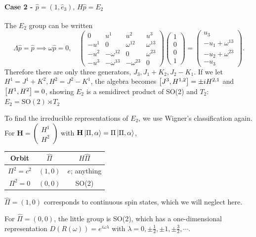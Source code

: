 \documentclass{article}
\begin{document}
\paragraph{Case 2 - $\hat p=(1,\hat e_3),\,H\hat p=E_2$} The $E_2$ group can be written 
$$\Lambda\hat p=\hat p\implies\omega\hat p=0,\quad\begin{pmatrix}0&u^1&u^2&u^3\\-u^1&0&\omega^{12}&\omega^{13}\\-u^2&-\omega^{12}&0&\omega^{23}\\-u^3&-\omega^{13}&-\omega^{23}&0\end{pmatrix}\begin{pmatrix}1\\0\\0\\1\end{pmatrix}=\begin{pmatrix}u_3\\-u_1+\omega^{13}\\-u_2+\omega^{23}\\-u_3\end{pmatrix}.$$
Therefore there are only three generators, $J_3,J_1+K_2,J_2-K_1$. If we let $H^1=J^1+K^2,H^2=J^2-K^1$, the algebra becomes $\comm{J^3}{H^{1,2}}=\pm iH^{2,1}$ and $\comm{H^1}{H^2}=0$, showing $E_2$ is a semidirect product of SO(2) and $T_2$: $E_2=\text{SO}(2)\rtimes T_2$

To find the irreducible representations of $E_2$, we use Wigner's classification again. For $\mathbf H=\begin{pmatrix}H^1\\H^2\end{pmatrix}$ with $\mathbf H\ket{\Pi,\alpha}=\Pi\ket{\Pi,\alpha}$, 
\begin{center}
\begin{tabular}{|c|c|c|}
     \hline
     Orbit & $\hat\Pi$ & $H\hat\Pi$\\
     \hline
     $\Pi^2=c^2$ & $(1,0)$ & $e$; anything\\
     \hline
     $\Pi^2=0$ & $(0,0)$ & SO(2)\\
     \hline
\end{tabular}
\end{center}

$\hat\Pi=(1,0)$ corresponds to continuous spin states, which we will neglect here. 

For $\hat\Pi=(0,0)$, the little group is SO(2), which has a one-dimensional representation $D(R(\omega))=e^{i\omega\lambda}$ with $\lambda=0,\pm\frac 12,\pm 1,\pm\frac 32,\cdots$.
\end{document}
